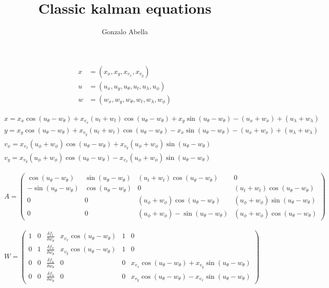 \documentclass[4pt]{article}
\title{Classic kalman equations}
\author{Gonzalo Abella}
\date{}
\begin{document}
  \maketitle

\begin{align}
  x &= (x_x, x_y, x_{v_x}, x_{v_y}) \\
  u &= (u_x, u_y, u_{\theta}, u_t, u_\lambda, u_\phi) \\
  w &= (w_x, w_y, w_{\theta}, w_t, w_\lambda, w_\phi)
\end{align}

\begin{align}
  x = x_x \cos(u_\theta-w_\theta) + x_{v_x}(u_t+w_t)\cos(u_\theta-w_\theta) + x_y\sin(u_\theta-w_\theta) - (u_x+w_x) + (u_\lambda+w_\lambda) \\
  y = x_y \cos(u_\theta-w_\theta) + x_{v_y}(u_t+w_t)\cos(u_\theta-w_\theta) - x_x\sin(u_\theta-w_\theta) - (u_x+w_x) + (u_\lambda+w_\lambda) \\
  v_x = x_{v_x} (u_\phi+w_\phi) \cos(u_\theta-w_\theta) + x_{v_y} (u_\phi+w_\phi) \sin(u_\theta-w_\theta) \\
  v_y = x_{v_y} (u_\phi+w_\phi) \cos(u_\theta-w_\theta) - x_{v_x} (u_\phi+w_\phi) \sin(u_\theta-w_\theta)
\end{align}

\begin{align}
A =
  \begin{pmatrix}
     \cos(u_\theta-w_\theta) &  \sin(u_\theta-w_\theta) & (u_t+w_t)\cos(u_\theta-w_\theta) & 0 \\
    -\sin(u_\theta-w_\theta) &  \cos(u_\theta-w_\theta) & 0 & (u_t+w_t)\cos(u_\theta-w_\theta) \\
    0 & 0 & (u_\phi+w_\phi)\cos(u_\theta-w_\theta) & (u_\phi+w_\phi)\sin(u_\theta-w_\theta) \\
    0 & 0 & (u_\phi+w_\phi)-\sin(u_\theta-w_\theta) & (u_\phi+w_\phi)\cos(u_\theta-w_\theta) 
  \end{pmatrix}
\end{align}

\begin{align}
W =
  \begin{pmatrix}
    1 & 0 & \frac{\delta f_1}{\delta w_\theta} & x_{v_x}\cos(u_\theta-w_\theta) & 1 & 0 \\
    0 & 1 & \frac{\delta f_2}{\delta w_\theta} & x_{v_y}\cos(u_\theta-w_\theta) & 1 & 0 \\
    0 & 0 & \frac{\delta f_3}{\delta w_\theta} & 0 & 0 & x_{v_x}\cos(u_\theta-w_\theta) + x_{v_y}\sin(u_\theta-w_\theta) \\
    0 & 0 & \frac{\delta f_4}{\delta w_\theta} & 0 & 0 & x_{v_y}\cos(u_\theta-w_\theta) - x_{v_x}\sin(u_\theta-w_\theta)
\end{pmatrix}
\end{align}

\begin{align}
\end{align}
\end{document}

